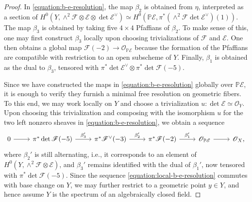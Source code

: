 \documentclass[12 pt]{amsart}
\theoremstyle{plain}
\theoremstyle{definition}
\theoremstyle{remark}
\numberwithin{equation}{section}
\newcommand\bp{\mathbb P}
\newcommand\sce{\mathscr E}
\newcommand\scf{\mathscr F}
\newcommand\sco{\mathscr O}
\begin{document}
\begin{proof}
	In \eqref{equation:b-e-resolution}, the map $\beta_2$ is obtained from
	$\eta$, interpreted as a section of 
	$H^0(Y, \wedge^2 \scf \otimes \sce \otimes \det \sce^{\vee}) \simeq
	H^0(\bp \sce, \pi^*(\wedge^2 \scf \det \sce^{\vee})(1))$.
	The map $\beta_3$ is obtained by taking five $4 \times 4$ Pfaffians
	of $\beta_2$.
	To make sense of this, one may first construct $\beta_3$ locally upon choosing trivializations of $\scf$
	and $\sce$. 
	One then obtains a global map $\scf(-2) \to \sco_{\bp \sce}$
	because the formation of
	the Pfaffians are compatible with restriction to an open subscheme of
	$Y$.
	Finally, $\beta_1$ is obtained as the dual to $\beta_3$, tensored with 
	 $\pi^* \det \sce^\vee \otimes \pi^*\det
	\scf(-5)$.

	Since we have constructed the maps in \eqref{equation:b-e-resolution}
	globally over $\bp \sce$, it is enough to verify they furnish a
	minimal free
	resolution on geometric fibers.
	To this end, we may work locally on $Y$ and choose a trivialization
	$u: \det \sce \simeq \sco_Y$.
	Upon choosing this trivialization and composing with the isomorphism $u$ for
	the two left nonzero sheaves in \eqref{equation:b-e-resolution},
	we obtain a sequence
	\begin{equation}
		\label{equation:local-b-e-resolution}
		\begin{tikzcd}
			0 \ar {r} & \pi^*\det
			\scf(-5) \ar {r}{\beta_3'} & \pi^* \scf^\vee(-3) \ar
			{r}{\beta_2'} & \pi^* \scf(-2) \ar {r}{\beta_1'}
			& \sco_{\bp \sce} \ar{r} & \sco_X,
	\end{tikzcd}\end{equation}
	where $\beta_2'$ is still alternating, i.e., it corresponds to an
	element of
	$H^0(Y, \wedge^2 \scf \otimes \sce)$, 
	and $\beta_3'$ remains identified with the dual of $\beta_1'$, now
	tensored with 
	$\pi^*\det \scf(-5)$.
	Since the sequence \eqref{equation:local-b-e-resolution} commutes with
	base change on $Y$, we may further restrict to a geometric point $y \in
	Y$,
	and hence assume $Y$ is the spectrum of an algebraically closed field.


\end{proof}
\end{document}
